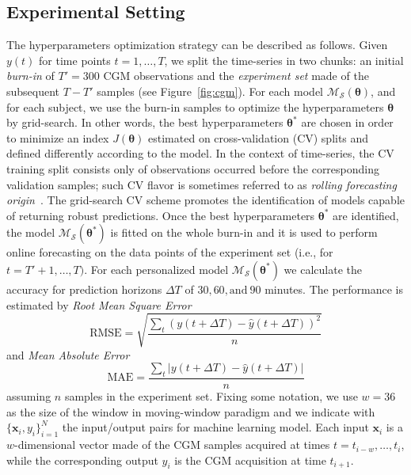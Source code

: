 \subsection{Experimental Setting}
The hyperparameters optimization strategy can be described as follows. Given $y(t)$ for time points $t=1,\dots,T$, we split the time-series in two chunks: an initial {\em burn-in} of $T' = 300$ CGM observations and the {\em experiment set} made of the subsequent $T - T'$ samples (see Figure~\ref{fig:cgm}). For each model $\mathcal{M}_\mathcal{S}(\bm{\theta})$, and for each subject, we use the burn-in samples to optimize the hyperparameters $\bm{\theta}$ by grid-search. In other words, the best hyperparameters $\bm{\theta}^*$  are chosen in order to minimize an index $J(\bm{\theta})$ estimated on cross-validation (CV) splits and defined differently according to the model. %
In the context of time-series, the CV training split consists only of observations occurred before the corresponding validation samples; such CV flavor is sometimes referred to as {\em rolling forecasting origin}~\cite{tashman2000out}. The grid-search CV scheme promotes the identification of models capable of returning robust predictions. %
Once the best hyperparameters $\bm{\theta}^*$ are identified, the model $\mathcal{M}_\mathcal{S}(\bm{\theta}^*)$ is fitted on the whole burn-in and it is used to perform online forecasting on the data points of the experiment set (i.e., for $t = T'+1, \dots, T)$. For each personalized model $\mathcal{M}_\mathcal{S}(\bm{\theta}^*)$ we calculate the accuracy for prediction horizons $\Delta T$ of $30, 60, \text{and}~90$ minutes. The performance is estimated by  {\em Root Mean Square Error}
\[
\text{RMSE} = \sqrt{\frac{\sum_t(y(t+\Delta T) - \hat{y}(t+\Delta T))^2}{n}}
\]
and {\em Mean Absolute Error}
\[
\text{MAE} = \frac{\sum_t|y(t+\Delta T) - \hat{y}(t+\Delta T)|}{n}
\]
assuming $n$ samples in the experiment set.
Fixing some notation, we use $w=36$ as the size of the window in moving-window paradigm and we  indicate with $\{\bm{x}_i, y_i\}_{i=1}^N$  the input/output pairs for machine learning model. 
Each input $\bm{x}_i$ is a $w$-dimensional vector made of the CGM samples acquired at times $t=t_{i-w},\dots,t_i$, while the corresponding output $y_i$ is the CGM acquisition at time $t_{i+1}$.



